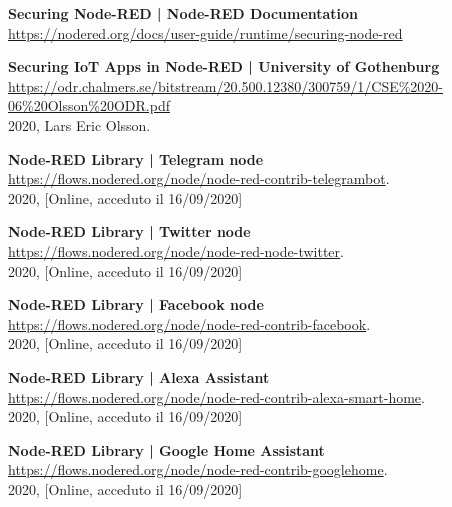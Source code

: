 \documentclass[a4paper,10pt]{memoir}
\begin{document}
\begin{thebibliography}{9}
    \textbf{Securing Node-RED | Node-RED Documentation}
    \\
    \href{https://nodered.org/docs/user-guide/runtime/securing-node-red}{https://nodered.org/docs/user-guide/runtime/securing-node-red}

    \textbf{Securing IoT Apps in Node-RED | University of Gothenburg}
    \\
    \href{https://odr.chalmers.se/bitstream/20.500.12380/300759/1/CSE\%2020-06\%20Olsson\%20ODR.pdf}{https://odr.chalmers.se/bitstream/20.500.12380/300759/1/CSE\%2020-06\%20Olsson\%20ODR.pdf}
    \\
    2020, Lars Eric Olsson.
    
    \textbf{Node-RED Library | Telegram node}
    \\
    \href{https://flows.nodered.org/node/node-red-contrib-telegrambot}{https://flows.nodered.org/node/node-red-contrib-telegrambot}.
    \\
    2020, [Online, acceduto il 16/09/2020]
    
    \textbf{Node-RED Library | Twitter node}
    \\
    \href{https://flows.nodered.org/node/node-red-node-twitter}{https://flows.nodered.org/node/node-red-node-twitter}.
    \\
    2020, [Online, acceduto il 16/09/2020]
    
    \textbf{Node-RED Library | Facebook node}
    \\
    \href{https://flows.nodered.org/node/node-red-contrib-facebook}{https://flows.nodered.org/node/node-red-contrib-facebook}.
    \\
    2020, [Online, acceduto il 16/09/2020]

    \textbf{Node-RED Library | Alexa Assistant}
    \\
    \href{https://flows.nodered.org/node/node-red-contrib-alexa-smart-home}{https://flows.nodered.org/node/node-red-contrib-alexa-smart-home}.
    \\
    2020, [Online, acceduto il 16/09/2020]

    \textbf{Node-RED Library | Google Home Assistant}
    \\
    \href{https://flows.nodered.org/node/node-red-contrib-googlehome}{https://flows.nodered.org/node/node-red-contrib-googlehome}.
    \\
    2020, [Online, acceduto il 16/09/2020]

\end{thebibliography}
\end{document}
